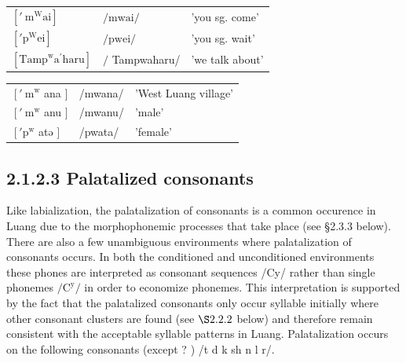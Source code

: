\documentclass[10pt]{article}
\begin{document}
\begin{center}
\begin{tabular}{lll}
\(\left[' \mathrm{~m}^{\mathrm{W}} \mathrm{ai}\right]\) & \(/ \mathrm{mwai} /\) & 'you sg. come' \\
\(\left[' \mathrm{p}^{\mathrm{W}} \mathrm{ei}\right]\) & \(/ \mathrm{pwei} /\) & 'you sg. wait' \\
\(\left[\mathrm{Tamp}^{\mathrm{w}} \mathrm{a}^{\prime} \mathrm{haru}\right]\) & \(/\) Tampwaharu/ & 'we talk about' \\
\end{tabular}
\end{center}

\begin{center}
\begin{tabular}{lll}
\(\left[' \mathrm{~m}^{\mathrm{w}}\right.\) ana \(]\) & /mwana/ & 'West Luang village' \\
\(\left[' \mathrm{~m}^{\mathrm{w}}\right.\) anu \(]\) & /mwanu/ & 'male' \\
\(\left[' \mathrm{p}^{\mathrm{w}}\right.\) atə \(]\) & /pwata/ & 'female' \\
\end{tabular}
\end{center}

\subsection*{2.1.2.3 Palatalized consonants}
Like labialization, the palatalization of consonants is a common occurence in Luang due to the morphophonemic processes that take place (see §2.3.3 below). There are also a few unambiguous environments where palatalization of consonants occurs. In both the conditioned and unconditioned environments these phones are interpreted as consonant sequences /Cy/ rather than single phonemes \(/ \mathrm{C}^{\mathrm{y}} /\) in order to economize phonemes. This interpretation is supported by the fact that the palatalized consonants only occur syllable initially where other consonant clusters are found (see \(\S 2.2 .2\) below) and therefore remain consistent with the acceptable syllable patterns in Luang. Palatalization occurs on the following consonants (except ? ) /t d k sh n l r/.
\end{document}
